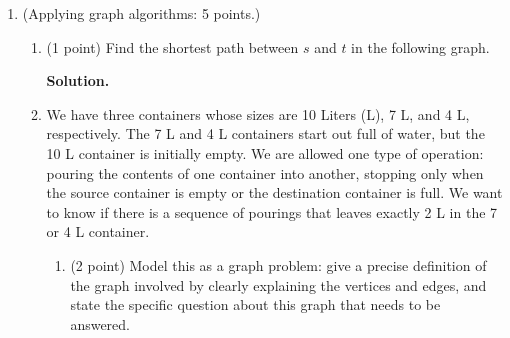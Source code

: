 \documentclass[11pt]{article}
\begin{document}
\begin{enumerate}

\item (Applying graph algorithms: 5 points.)

  \begin{enumerate}    
    
  \item (1 point) Find the shortest path between $s$ and $t$ in the following graph.
    
    \begin{figure}[h]
      \centering
    \end{figure}

\textbf{Solution.} 

\begin{figure}[h]
      \centering
    \end{figure}

  \item We have three containers whose sizes are 10 Liters (L), 7 L, and 4 L, respectively. The 7 L and 4 L containers start out full of water, but the 10 L container is initially empty. We are allowed one type of operation: pouring the contents of one container into another, stopping only when the source container is empty or the destination container is full. We want to know if there is a sequence of pourings that leaves exactly 2 L in the 7 or 4 L container.
    \begin{enumerate}[label=(\roman*)]
    \item (2 point) Model this as a graph problem: give a precise definition of the
      graph involved by clearly explaining the vertices and edges, and state the specific question about this graph that
      needs to be answered. \\


\end{enumerate}
\end{enumerate}
\end{enumerate}
\end{document}
